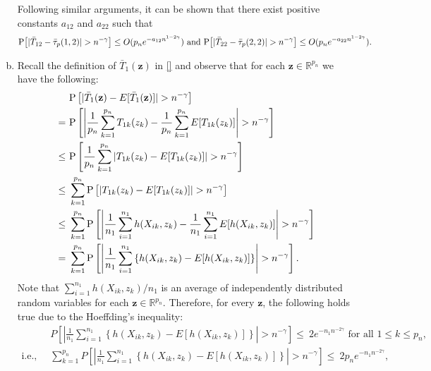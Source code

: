 \documentclass[twoside]{article}
\newcommand{\bz}{\mathbf{z}}
\newcommand{\0}{\mathbf{0}}
\newcommand{\1}{\mathbf{1}}
\numberwithin{equation}{section}
\begin{document}
\begin{enumerate}[(a)]
Following similar arguments, it can be shown that there exist positive constants $a_{12}$ and $a_{22}$ such that
\begin{align}\label{ref12}
{\rm P}\big [|\bar{T}_{12}-\bar{\tau}_p(1,2)|>n^{-\gamma} \big]\leq O(p_n e^{-a_{12} n^{1-2\gamma}})\text{ and } {\rm P}\big [|\bar{T}_{22}-\bar{\tau}_p(2,2)|>n^{-\gamma} \big]\leq O(p_n e^{-a_{22} n^{1-2\gamma}}).
\end{align}

 \item Recall the definition of $\bar{T}_{1}(\bz)$ in \eqref{} and observe that for each $\bz\in\mathbb{R}^{p_n}$ we have the following:
 \begin{align}\label{nref5}
    &\  {\rm P}\left [|\bar{T}_{1}(\bz)-E[\bar{T}_{1}(\bz)]|>n^{-\gamma} \right ]\nonumber \\
     = &\  {\rm P}\left [\left |\frac{1}{p_n}\sum\limits_{k=1}^{p_n}T_{1k}(z_k)-\frac{1}{p_n}\sum\limits_{k=1}^{p_n}E[T_{1k}(z_k)]\right |>n^{-\gamma}\right ]\nonumber \\
     \leq &\  {\rm P}\left [\frac{1}{p_n}\sum\limits_{k=1}^{p_n}\left |T_{1k}(z_k)-E[T_{1k}(z_k)]\right |>n^{-\gamma} \right ]\nonumber \\
     \leq &\  \sum\limits_{k=1}^{p_n}{\rm P}\left [\left |T_{1k}(z_k)-E[T_{1k}(z_k)]\right |>n^{-\gamma} \right ]\nonumber \\
     \leq &\  \sum\limits_{k=1}^{p_n}{\rm P}\left [\left |\frac{1}{n_1}\sum\limits_{i=1}^{n_1}h(X_{ik},z_k)-\frac{1}{n_1}\sum\limits_{i=1}^{n_1}E[h(X_{ik},z_k)]\right |>n^{-\gamma}\right ]\nonumber \\
     = &\  \sum\limits_{k=1}^{p_n}{\rm P}\left [\left |\frac{1}{n_1}\sum\limits_{i=1}^{n_1}\left \{ h(X_{ik},z_k)-E[h(X_{ik},z_k)]\right \}\right |>n^{-\gamma}\right ].
\end{align}
Note that $\sum_{i=1}^{n_1}h(X_{ik},z_k)/n_1$ is an average of independently distributed random variables for each $\bz\in\mathbb{R}^{p_n}$. Therefore, for every $\bz$, the following holds true due to the Hoeffding's inequality:
\begin{align}\label{nref6}
    &\ P\left [\left |\frac{1}{n_1} \sum_{i=1}^{n_1}\left \{h(X_{ik},z_k) - E[h(X_{ik},z_k)]\right \}\right |> n^{-\gamma}\right ]\leq \ 2e^{-n_1n^{-2\gamma}}\text{ for all }1\leq k\leq p_n,\nonumber \\
    \text{i.e., }&\ \sum\limits_{k=1}^{p_n} P\left [\left |\frac{1}{n_1} \sum_{i=1}^{n_1}\left \{ h(X_{ik},z_k) - E[h(X_{ik},z_k)]\right \}\right |> n^{-\gamma}\right ]\leq \ 2p_ne^{-n_1n^{-2\gamma}},\nonumber \\

\end{align}
\end{enumerate}
\end{document}
